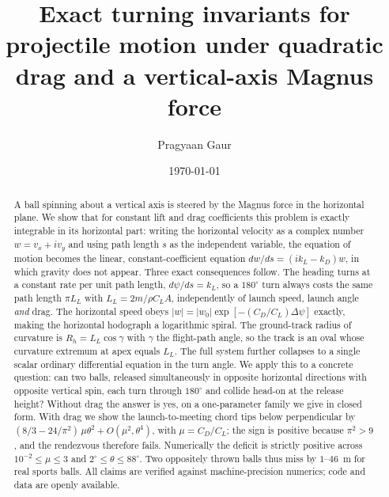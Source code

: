 \documentclass[aip,amsmath,amssymb,preprint,floatfix]{revtex4-2}
\newcommand{\kL}{k_{L}}
\newcommand{\kD}{k_{D}}
\newcommand{\LL}{L_{L}}
\begin{document}
\title{Exact turning invariants for projectile motion under quadratic drag and a
vertical-axis Magnus force}

\author{Pragyaan Gaur}

\date{\today}

\begin{abstract}
A ball spinning about a vertical axis is steered by the Magnus force in the
horizontal plane. We show that for constant lift and drag coefficients this
problem is exactly integrable in its horizontal part: writing the horizontal
velocity as a complex number $w=v_x+iv_y$ and using path length $s$ as the
independent variable, the equation of motion becomes the linear, constant-coefficient
equation $dw/ds=(i\kL-\kD)w$, in which gravity does not appear. Three exact
consequences follow. The heading turns at a constant rate per unit path length,
$d\psi/ds=\kL$, so a $180^\circ$ turn always costs the same path length $\pi \LL$
with $\LL=2m/\rho C_L A$, independently of launch speed, launch angle \emph{and}
drag. The horizontal speed obeys $|w|=|w_0|\exp[-(C_D/C_L)\Delta\psi]$ exactly,
making the horizontal hodograph a logarithmic spiral. The ground-track radius of
curvature is $R_h=\LL\cos\gamma$ with $\gamma$ the flight-path angle, so the track
is an oval whose curvature extremum at apex equals $\LL$. The full system further
collapses to a single scalar ordinary differential equation in the turn angle.
We apply this to a concrete question: can two balls, released simultaneously in
opposite horizontal directions with opposite vertical spin, each turn through
$180^\circ$ and collide head-on at the release height? Without drag the answer is
yes, on a one-parameter family we give in closed form. With drag we show the
launch-to-meeting chord tips below perpendicular by
$(8/3-24/\pi^2)\,\mu\theta^2+O(\mu^2,\theta^4)$, with $\mu=C_D/C_L$; the sign is
positive because $\pi^2>9$, and the rendezvous therefore fails. Numerically the
deficit is strictly positive across $10^{-2}\le\mu\le3$ and $2^\circ\le\theta\le88^\circ$.
Two oppositely thrown balls thus miss by $1$--$46$~m for real sports balls.
All claims are verified against machine-precision numerics; code and data are
openly available.
\end{abstract}

\maketitle
\end{document}
